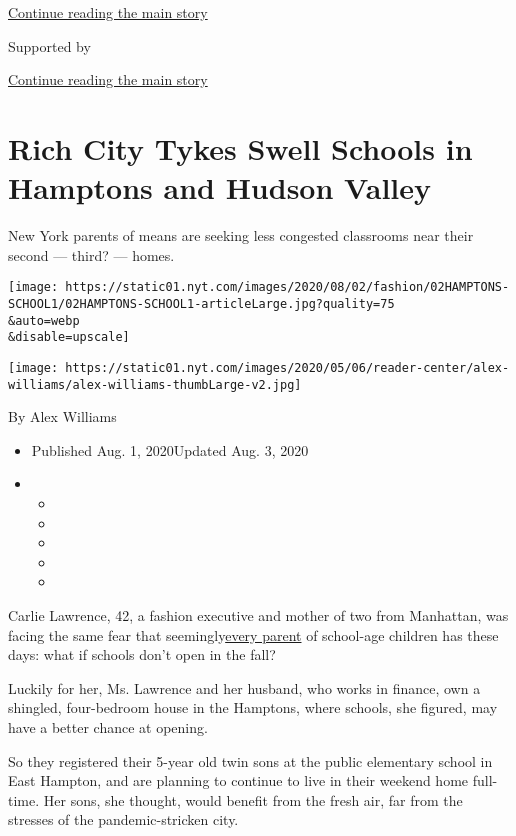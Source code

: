 \protect\hyperlink{after-top}{Continue reading the main story}

Supported by

\protect\hyperlink{after-sponsor}{Continue reading the main story}

\hypertarget{rich-city-tykes-swell-schools-in-hamptons-and-hudson-valley}{%
\section{Rich City Tykes Swell Schools in Hamptons and Hudson
Valley}\label{rich-city-tykes-swell-schools-in-hamptons-and-hudson-valley}}

New York parents of means are seeking less congested classrooms near
their second --- third? --- homes.

\texttt{[image: https://static01.nyt.com/images/2020/08/02/fashion/02HAMPTONS-SCHOOL1/02HAMPTONS-SCHOOL1-articleLarge.jpg?quality=75\\\&auto=webp\\\&disable=upscale]}

\texttt{[image: https://static01.nyt.com/images/2020/05/06/reader-center/alex-williams/alex-williams-thumbLarge-v2.jpg]}

By Alex Williams

\begin{itemize}
\item
  Published Aug. 1, 2020Updated Aug. 3, 2020
\item
  \begin{itemize}
  \item
  \item
  \item
  \item
  \item
  \end{itemize}
\end{itemize}

Carlie Lawrence, 42, a fashion executive and mother of two from
Manhattan, was facing the same fear that
seemingly\href{https://www.nytimes.com/2020/07/30/nyregion/pod-schools-hastings-on-hudson.html}{every
parent} of school-age children has these days: what if schools don't
open in the fall?

Luckily for her, Ms. Lawrence and her husband, who works in finance, own
a shingled, four-bedroom house in the Hamptons, where schools, she
figured, may have a better chance at opening.

So they registered their 5-year old twin sons at the public elementary
school in East Hampton, and are planning to continue to live in their
weekend home full-time. Her sons, she thought, would benefit from the
fresh air, far from the stresses of the pandemic-stricken city.

